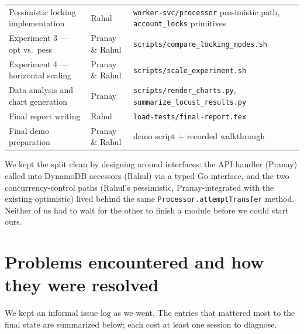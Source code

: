\documentclass[11pt,a4paper]{article}
\begin{document}
\begin{table}[h]
\begin{tabular}{>{\raggedright\arraybackslash}p{5.6cm} >{\raggedright\arraybackslash}p{3.6cm} >{\raggedright\arraybackslash}p{5.2cm}}
Pessimistic locking implementation          & Rahul           & \texttt{worker-svc/processor} pessimistic path, \texttt{account\_locks} primitives \\
Experiment 3 --- opt vs.\ pess              & Pranay \& Rahul & \texttt{scripts/compare\_locking\_modes.sh} \\
Experiment 4 --- horizontal scaling         & Pranay \& Rahul & \texttt{scripts/scale\_experiment.sh} \\
Data analysis and chart generation          & Pranay          & \texttt{scripts/render\_charts.py}, \texttt{summarize\_locust\_results.py} \\
Final report writing                        & Rahul           & \texttt{load-tests/final-report.tex} \\
Final demo preparation                      & Pranay \& Rahul & demo script + recorded walkthrough \\
\bottomrule
\end{tabular}
\end{table}

We kept the split clean by designing around interfaces: the API handler (Pranay) called into DynamoDB accessors (Rahul) via a typed Go interface, and the two concurrency-control paths (Rahul's pessimistic, Pranay-integrated with the existing optimistic) lived behind the same \texttt{Processor.attemptTransfer} method. Neither of us had to wait for the other to finish a module before we could start ours.

\section{Problems encountered and how they were resolved}

We kept an informal issue log as we went. The entries that mattered most to the final state are summarized below; each cost at least one session to diagnose.
\end{document}
